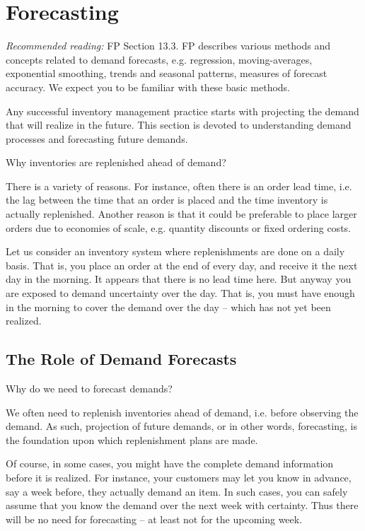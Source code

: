 \section{Forecasting}
\label{sec:forecast}


\textit{Recommended reading:} FP Section 13.3. FP describes various methods and concepts related to demand forecasts, e.g. regression, moving-averages, exponential smoothing, trends and seasonal patterns, measures of forecast accuracy. We expect you to be familiar with these basic methods. 

Any successful inventory management practice starts with projecting the demand that will realize in the future. This section is devoted to understanding demand processes and forecasting future demands. 

\begin{exercise}
Why inventories are replenished ahead of demand?


  \begin{solution}
    There is a variety of reasons. For instance, often there is an order lead time, i.e. the lag between the time that an order is placed and the time inventory is actually replenished. Another reason is that it could be preferable to place larger orders due to economies of scale, e.g. quantity discounts or fixed ordering costs. 
    
	Let us consider an inventory system where replenishments are done on a daily basis. That is, you place an order at the end of every day, and receive it the next day in the morning. It appears that there is no lead time here. But anyway you are exposed to demand uncertainty over the day. That is, you must have enough in the morning to cover the demand over the day -- which has not yet been realized. 
  \end{solution}
\end{exercise}


\subsection{The Role of Demand Forecasts}

\begin{exercise}
Why do we need to forecast demands?



  \begin{solution}
    We often need to replenish inventories ahead of demand, i.e. before observing the demand. As such, projection of future demands, or in other words, forecasting, is the foundation upon which replenishment plans are made. 
    
    Of course, in some cases, you might have the complete demand information before it is realized. For instance, your customers may let you know in advance, say a week before, they actually demand an item. In such cases, you can safely assume that you know the demand over the next week with certainty. Thus there will be no need for forecasting -- at least not for the upcoming week. 
  \end{solution}
\end{exercise}


